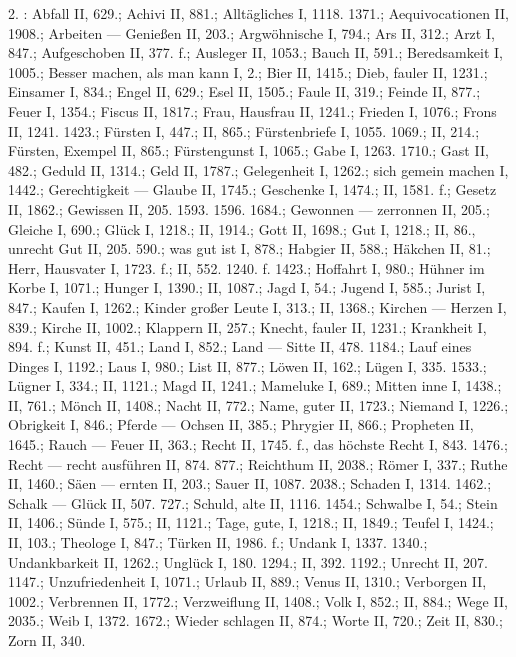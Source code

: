 2. : Abfall II, 629.; Achivi II, 881.; Alltägliches I, 1118. 1371.; Aequivocationen II, 1908.; Arbeiten — Genießen II, 203.; Argwöhnische I, 794.; Ars II, 312.; Arzt I, 847.; Aufgeschoben II, 377. f.; Ausleger II, 1053.; Bauch II, 591.; Beredsamkeit I, 1005.; Besser machen, als man kann I, 2.; Bier II, 1415.; Dieb, fauler II, 1231.; Einsamer I, 834.; Engel II, 629.; Esel II, 1505.; Faule II, 319.; Feinde II, 877.; Feuer I, 1354.; Fiscus II, 1817.; Frau, Hausfrau II, 1241.; Frieden I, 1076.; Frons II, 1241. 1423.; Fürsten I, 447.; II, 865.; Fürstenbriefe I, 1055. 1069.; II, 214.; Fürsten, Exempel II, 865.; Fürstengunst I, 1065.; Gabe I, 1263. 1710.; Gast II, 482.; Geduld II, 1314.; Geld II, 1787.; Gelegenheit I, 1262.; sich gemein machen I, 1442.; Gerechtigkeit — Glaube II, 1745.; Geschenke I, 1474.; II, 1581. f.; Gesetz II, 1862.; Gewissen II, 205. 1593. 1596. 1684.; Gewonnen — zerronnen II, 205.; Gleiche I, 690.; Glück I, 1218.; II, 1914.; Gott II, 1698.; Gut I, 1218.; II, 86., unrecht Gut II, 205. 590.; was gut ist I, 878.; Habgier II, 588.; Häkchen II, 81.; Herr, Hausvater I, 1723. f.; II, 552. 1240. f. 1423.; Hoffahrt I, 980.; Hühner im Korbe I, 1071.; Hunger I, 1390.; II, 1087.; Jagd I, 54.; Jugend I, 585.; Jurist I, 847.; Kaufen I, 1262.; Kinder großer Leute I, 313.; II, 1368.; Kirchen — Herzen I, 839.; Kirche II, 1002.; Klappern II, 257.; Knecht, fauler II, 1231.; Krankheit I, 894. f.; Kunst II, 451.; Land I, 852.; Land — Sitte II, 478. 1184.; Lauf eines Dinges I, 1192.; Laus I, 980.; List II, 877.; Löwen II, 162.; Lügen I, 335. 1533.; Lügner I, 334.; II, 1121.; Magd II, 1241.; Mameluke I, 689.; Mitten inne I, 1438.; II, 761.; Mönch II, 1408.; Nacht II, 772.; Name, guter II, 1723.; Niemand I, 1226.; Obrigkeit I, 846.; Pferde — Ochsen II, 385.; Phrygier II, 866.; Propheten II, 1645.; Rauch — Feuer II, 363.; Recht II, 1745. f., das höchste Recht I, 843. 1476.; Recht — recht ausführen II, 874. 877.; Reichthum II, 2038.; Römer I, 337.; Ruthe II, 1460.; Säen — ernten II, 203.; Sauer II, 1087. 2038.; Schaden I, 1314. 1462.; Schalk — Glück II, 507. 727.; Schuld, alte II, 1116. 1454.; Schwalbe I, 54.; Stein II, 1406.; Sünde I, 575.; II, 1121.; Tage, gute, I, 1218.; II, 1849.; Teufel I, 1424.; II, 103.; Theologe I, 847.; Türken II, 1986. f.; Undank I, 1337. 1340.; Undankbarkeit II, 1262.; Unglück I, 180. 1294.; II, 392. 1192.; Unrecht II, 207. 1147.; Unzufriedenheit I, 1071.; Urlaub II, 889.; Venus II, 1310.; Verborgen II, 1002.; Verbrennen II, 1772.; Verzweiflung II, 1408.; Volk I, 852.; II, 884.; Wege II, 2035.; Weib I, 1372. 1672.; Wieder schlagen II, 874.; Worte II, 720.; Zeit II, 830.; Zorn II, 340.

